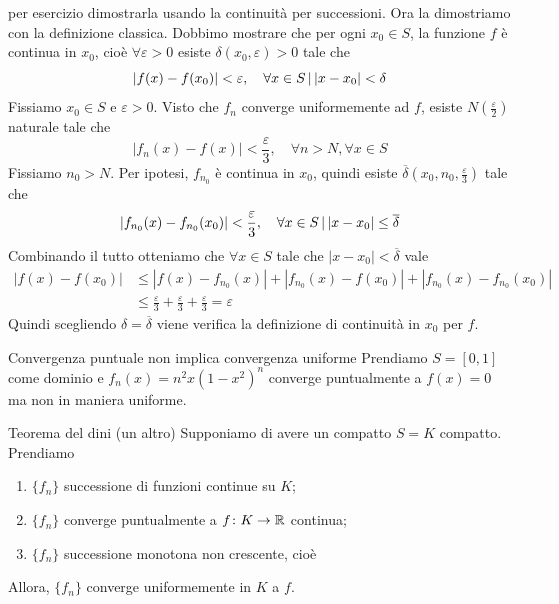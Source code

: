 \documentclass[a4paper]{article}
\begin{document}
\begin{snippetproof}{}
    per esercizio dimostrarla usando la continuità
    per successioni. Ora la dimostriamo con la definizione classica.
    Dobbimo mostrare che per ogni \(x_0 \in S\),
    la funzione \(f\) è continua in \(x_0\),
    cioè \(\forall \varepsilon > 0\) esiste \(\delta(x_0, \varepsilon) > 0\)
    tale che \[
        |f(x) - f(x_0)| < \varepsilon, \quad \forall x \in S \,|\, |x-x_0| < \delta
    \]
    Fissiamo \(x_0 \in S\) e \(\varepsilon > 0\).
    Visto che \(f_n\) converge uniformemente ad \(f\), esiste \(N\left(\frac{\varepsilon}{2}\right)\)
    naturale tale che
    \[
        |f_n(x) - f(x)| < \frac{\varepsilon}{3}, \quad \forall n > N, \forall x \in S
    \]
    Fissiamo \(n_0 > N\).
    Per ipotesi, \(f_{n_0}\) è continua in \(x_0\),
    quindi esiste \(\overline \delta\left(x_0, n_0, \frac{\varepsilon}{3}\right)\) tale che
    \[
        |f_{n_0}(x) - f_{n_0}(x_0)| < \frac{\varepsilon}{3},
        \quad \forall x \in S \,|\, |x-x_0| \leq \overline\delta
    \]
    Combinando il tutto otteniamo che \(\forall x \in S\) tale che \(|x-x_0| < \overline\delta\) vale
    \begin{align*}
        |f(x) - f(x_0)| &\leq |f(x) - f_{n_0}(x)| + |f_{n_0}(x) - f(x_0)|
        + |f_{n_0}(x) - f_{n_0}(x_0)| \\
        &\leq \frac{\varepsilon}{3} + \frac{\varepsilon}{3} + \frac{\varepsilon}{3} = \varepsilon
    \end{align*}
    Quindi scegliendo \(\delta = \overline \delta\) viene verifica la definizione di continuità in \(x_0\)
    per \(f\).
\end{snippetproof}

\begin{snippetexample}{Convergenza puntuale non implica convergenza uniforme}
    Prendiamo \(S = [0,1]\) come dominio e \(f_n(x) = n^2 x (1-x^2)^n\)
    converge puntualmente a \(f(x) = 0\) ma non in maniera uniforme.
\end{snippetexample}

\begin{snippettheorem}{Teorema del dini (un altro)}
    Supponiamo di avere un compatto \(S=K\) compatto. Prendiamo
    \begin{enumerate}
        \item \(\{f_n\}\) successione di funzioni continue su \(K\);
        \item \(\{f_n\}\) converge puntualmente a \(f \colon K \to \mathbb{R}\) continua;
        \item \(\{f_n\}\) successione monotona non crescente, cioè
    \end{enumerate}
    Allora, \(\{f_n\}\) converge uniformemente in \(K\) a \(f\).
\end{snippettheorem}
\end{document}
